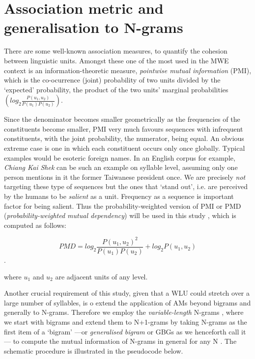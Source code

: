 \documentclass[a4]{article}
\begin{document}


\section{Association metric and generalisation to N-grams}


There are some well-known association measures, to quantify the cohesion between linguistic units. Amongst these one of the most used in the MWE context is an information-theoretic measure, \emph{pointwise mutual information} (PMI), which is the co-ocurrence (joint) probability of two units divided by the `expected' probability, the product of the two units' marginal probabilities $( log_2\frac{P(u_1,u_2)}{P(u_1)P(u_2)} )$.

\smallskip

Since the denominator becomes smaller geometrically as the frequencies of the constituents become smaller, PMI very much favours sequences with infrequent constituents, with the joint probability, the numerator, being equal. An obvious extreme case is one in which each constituent occurs only once globally. Typical examples would be esoteric foreign names. In an English corpus for example, \emph{Chiang Kai Shek} can be such an example on syllable level, assuming only one person mentions in it the former Taiwanese president once. We are precisely \emph{not} targeting these type of sequences but the ones that `stand out', i.e. are perceived by the humans to be \emph{salient} as a unit. Frequency as a sequence is important factor for being salient. Thus the probability-weighted version of PMI or PMD (\emph{probability-weighted mutual dependency}) will be used in this study \cite{ThanopoulosEtAl02}, which is computed as follows:

$$ PMD= log_2 \frac{P(u_1,u_2)^2}{P(u_1)P(u_2)}+log_2 P(u_1,u_2)$$.

\noindent where $u_1$ and $u_2$ are adjacent units of any level. 

Another crucial requirement of this study, given that a WLU could stretch over a large number of syllables, is  o extend the application of AMs beyond bigrams and generally to N-grams. Therefore we employ the \emph{variable-length} N-grams \cite{Kneser96,KeplerEtAl12}, where we start with bigrams and extend them to N+1-grams by taking N-grams as the first item of a `bigram' ---or \emph{generalised bigram} or GBGs as we henceforth call it--- to compute the mutual information of N-grams in general for any N \cite{PitlerEtAl10,DuEtAl15}. The schematic procedure is illustrated in the pseudocode below.
\end{document}
